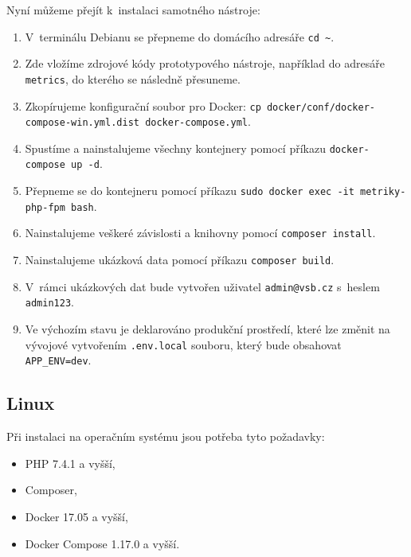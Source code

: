 \documentclass[czech,master]{diploma}
\begin{document}
Nyní můžeme přejít k~instalaci samotného nástroje:
\begin{enumerate}
\item V~terminálu Debianu se přepneme do domácího adresáře \texttt{cd \textasciitilde}.
\item Zde vložíme zdrojové kódy prototypového nástroje, například do adresáře \texttt{metrics}, do kterého se následně přesuneme.
\item Zkopírujeme konfigurační soubor pro Docker: \texttt{cp docker/conf/docker-compose-win.yml.dist docker-compose.yml}.
\item Spustíme a nainstalujeme všechny kontejnery pomocí příkazu \texttt{docker-compose up -d}.
\item Přepneme se do kontejneru pomocí příkazu \texttt{sudo docker exec -it metriky-php-fpm bash}.
\item Nainstalujeme veškeré závislosti a knihovny pomocí \texttt{composer install}.
\item Nainstalujeme ukázková data pomocí příkazu \texttt{composer build}.
\item V~rámci ukázkových dat bude vytvořen uživatel \texttt{admin@vsb.cz} s~heslem \texttt{admin123}.
\item Ve výchozím stavu je deklarováno produkční prostředí, které lze změnit na vývojové vytvořením \texttt{.env.local} souboru, který bude obsahovat \texttt{APP\_ENV=dev}.
\end{enumerate}

\subsection{Linux}
Při instalaci na operačním systému jsou potřeba tyto požadavky:
\begin{itemize}
\item PHP 7.4.1 a vyšší,
\item Composer,
\item Docker 17.05 a vyšší,
\item Docker Compose 1.17.0 a vyšší.
\end{itemize}
 
\end{document}
